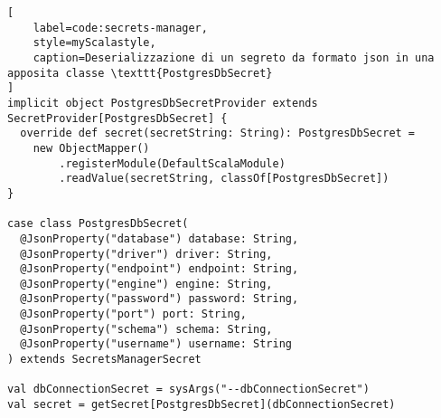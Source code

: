 \begin{lstlisting}[
    label=code:secrets-manager,
    style=myScalastyle,
    caption=Deserializzazione di un segreto da formato json in una apposita classe \texttt{PostgresDbSecret}
]
implicit object PostgresDbSecretProvider extends SecretProvider[PostgresDbSecret] {
  override def secret(secretString: String): PostgresDbSecret =
    new ObjectMapper()
        .registerModule(DefaultScalaModule)
        .readValue(secretString, classOf[PostgresDbSecret])
}

case class PostgresDbSecret(
  @JsonProperty("database") database: String,
  @JsonProperty("driver") driver: String,
  @JsonProperty("endpoint") endpoint: String,
  @JsonProperty("engine") engine: String,
  @JsonProperty("password") password: String,
  @JsonProperty("port") port: String,
  @JsonProperty("schema") schema: String,
  @JsonProperty("username") username: String
) extends SecretsManagerSecret

val dbConnectionSecret = sysArgs("--dbConnectionSecret")
val secret = getSecret[PostgresDbSecret](dbConnectionSecret)
\end{lstlisting}